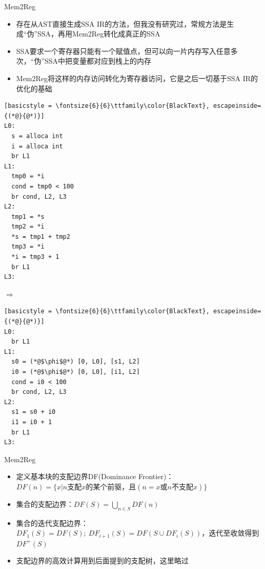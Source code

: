 \documentclass{beamer}
\begin{document}
\begin{frame}[fragile]{Mem2Reg}
\begin{itemize}
  \item 存在从AST直接生成SSA IR的方法，但我没有研究过，常规方法是生成``伪''SSA，再用Mem2Reg转化成真正的SSA
  \item SSA要求一个寄存器只能有一个赋值点，但可以向一片内存写入任意多次，``伪''SSA中把变量都对应到栈上的内存
  \item Mem2Reg将这样的内存访问转化为寄存器访问，它是之后一切基于SSA IR的优化的基础
\end{itemize}
\begin{center}
\begin{minipage}{0.28\textwidth}
  \begin{lstlisting}[basicstyle = \fontsize{6}{6}\ttfamily\color{BlackText}, escapeinside={(*@}{@*)}]
L0:
  s = alloca int
  i = alloca int
  br L1
L1:
  tmp0 = *i
  cond = tmp0 < 100
  br cond, L2, L3
L2:
  tmp1 = *s
  tmp2 = *i
  *s = tmp1 + tmp2
  tmp3 = *i
  *i = tmp3 + 1
  br L1
L3:
  \end{lstlisting}
\end{minipage}\hspace{0.5cm}
$\Rightarrow$
\hspace{0.4cm}
\begin{minipage}{0.35\textwidth}
  \begin{lstlisting}[basicstyle = \fontsize{6}{6}\ttfamily\color{BlackText}, escapeinside={(*@}{@*)}]
L0:
  br L1
L1:
  s0 = (*@$\phi$@*) [0, L0], [s1, L2]
  i0 = (*@$\phi$@*) [0, L0], [i1, L2]
  cond = i0 < 100
  br cond, L2, L3
L2:
  s1 = s0 + i0
  i1 = i0 + 1
  br L1
L3:
  \end{lstlisting}
\end{minipage}
\end{center}
\end{frame}

\begin{frame}{Mem2Reg}
\begin{itemize}
  \item 定义基本块的支配边界DF(Dominance Frontier)：$DF(n) = \{ x | n\text{支配}x\text{的某个前驱，且}(n = x\text{或}n\text{不支配}x) \}$
  \item 集合的支配边界：$DF(S) = \bigcup_{n \in S} DF(n)$
  \item 集合的迭代支配边界：$DF_1(S) = DF(S);\ DF_{i + 1}(S) = DF(S \cup DF_i(S))$，迭代至收敛得到$DF^+(S)$
  \item 支配边界的高效计算用到后面提到的支配树，这里略过
\end{itemize}
\end{frame}
\end{document}

